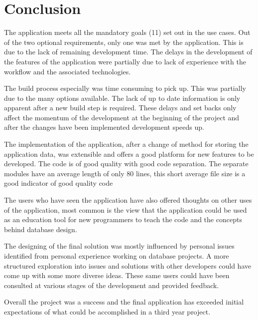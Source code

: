 \chapter{Conclusion}\label{conclusion}

The application meets all the mandatory goals (11) set out in the use cases.
Out of the two optional requirements, only one was met by the application.
This is due to the lack of remaining development time. The
delays in the development of the features of the application were
partially due to lack of experience with the workflow and the associated
technologies.

The build process especially was time consuming to pick up. This was
partially due to the many options available. The lack of up to date
information is only apparent after a new build step is required. These
delays and set backs only affect the momentum of the
development at the beginning of the project and after the changes have
been implemented development speeds up.

The implementation of the application, after a change of method for
storing the application data, was extensible and offers a good platform
for new features to be developed. The code is of good quality with
good code separation. The separate modules have an average length of only 80
lines, this short average file size is a good indicator of good quality code

The users who have seen the application have also offered thoughts on
other uses of the application, most common is the view that the
application could be used as an education tool for new programmers to
teach the code and the concepts behind database design.

The designing of the final solution was mostly influenced by personal
issues identified from personal experience working on database projects.
A more structured exploration into issues and solutions with other
developers could have come up with some more diverse ideas. These same
users could have been consulted at various stages of the development and
provided feedback.

Overall the project was a success and the final application has exceeded
initial expectations of what could be accomplished in a third year project.
